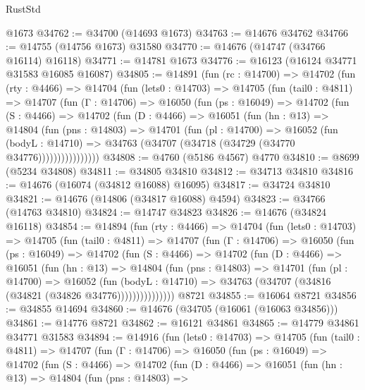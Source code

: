 \begin{lexlean}{RustStd}
\begin{coremodule}
    @1673
@34762 := @34700 (@14693 @1673)
@34763 := @14676 @34762
@34766 := @14755 (@14756 @1673) @31580
@34770 := @14676 (@14747 (@34766 @16114) @16118)
@34771 := @14781 @1673
@34776 := @16123 (@16124 @34771 @31583 @16085 @16087)
@34805 := @14891
    (fun (rc : @14700) =>
    @14702
      (fun (rty : @4466) =>
      @14704
        (fun (lets0 : @14703) =>
        @14705
          (fun (tail0 : @4811) =>
          @14707
            (fun (Γ : @14706) =>
            @16050
              (fun (ps : @16049) =>
              @14702
                (fun (S : @4466) =>
                @14702
                  (fun (D : @4466) =>
                  @16051
                    (fun (hn : @13) =>
                    @14804
                      (fun (pns : @14803) =>
                      @14701
                        (fun (pl : @14700) =>
                        @16052
                          (fun (bodyL : @14710) =>
                          @34763 (@34707 (@34718 (@34729 (@34770 @34776))))))))))))))))
@34808 := @4760 (@5186 @4567) @4770
@34810 := @8699 (@5234 @34808)
@34811 := @34805 @34810
@34812 := @34713 @34810
@34816 := @14676 (@16074 (@34812 @16088) @16095)
@34817 := @34724 @34810
@34821 := @14676 (@14806 (@34817 @16088) @4594)
@34823 := @34766 (@14763 @34810)
@34824 := @14747 @34823
@34826 := @14676 (@34824 @16118)
@34854 := @14894
    (fun (rty : @4466) =>
    @14704
      (fun (lets0 : @14703) =>
      @14705
        (fun (tail0 : @4811) =>
        @14707
          (fun (Γ : @14706) =>
          @16050
            (fun (ps : @16049) =>
            @14702
              (fun (S : @4466) =>
              @14702
                (fun (D : @4466) =>
                @16051
                  (fun (hn : @13) =>
                  @14804
                    (fun (pns : @14803) =>
                    @14701
                      (fun (pl : @14700) =>
                      @16052
                        (fun (bodyL : @14710) =>
                        @34763 (@34707 (@34816 (@34821 (@34826 @34776)))))))))))))))
    @8721
@34855 := @16064 @8721
@34856 := @34855 @14694
@34860 := @14676 (@34705 (@16061 (@16063 @34856)))
@34861 := @14776 @8721
@34862 := @16121 @34861
@34865 := @14779 @34861 @34771 @31583
@34894 := @14916
    (fun (lets0 : @14703) =>
    @14705
      (fun (tail0 : @4811) =>
      @14707
        (fun (Γ : @14706) =>
        @16050
          (fun (ps : @16049) =>
          @14702
            (fun (S : @4466) =>
            @14702
              (fun (D : @4466) =>
              @16051
                (fun (hn : @13) =>
                @14804
                  (fun (pns : @14803) =>

\end{coremodule}
\end{lexlean}
